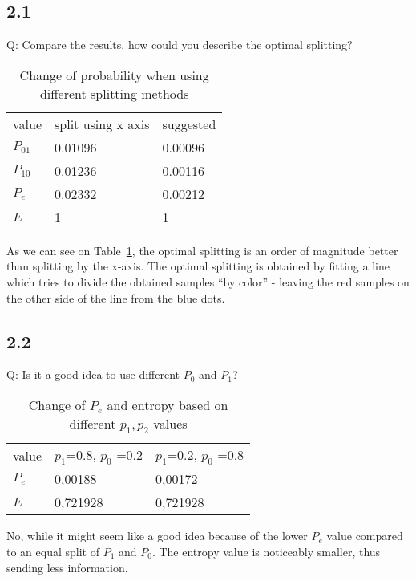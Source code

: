 \documentclass{article}
\begin{document}
\subsection*{2.1}
Q: Compare the results, how could you describe the optimal splitting?   

\begin{table}[ht!]
    \caption{Change of probability when using different splitting methods}
    \label{tab:tab21}
    \begin{center}
        \begin{tabular}[c]{l|l|l}
            value & split using x axis & suggested\\
            $P_{01}$ & 0.01096 & 0.00096\\
            $P_{10}$ & 0.01236 & 0.00116\\
            $P_e$ & 0.02332 & 0.00212\\
            $E$ & 1 & 1\\
        \end{tabular}
    \end{center}
\end{table}

As we can see on Table~\ref{tab:tab21}, the optimal splitting is an order of magnitude better than
splitting by the x-axis. The optimal splitting is obtained by fitting a line
which tries to divide the obtained samples “by color” - leaving the red samples
on the other side of the line from the blue dots. 

\subsection*{2.2} 
Q: Is it a good idea to use different $P_0$ and $P_1$?
\begin{table}[ht!]
    \caption{Change of $P_e$ and entropy based on different $p_1, p_2$ values}
    \label{tab:tab22}
    \begin{center}
        \begin{tabular}[c]{l|l|l}
            value & $p_1$=0.8, $p_0$ =0.2 &	$p_1$=0.2, $p_0$ =0.8\\
            $P_e$ & 0,00188 & 0,00172\\
            $E$ & 0,721928 & 0,721928\\
        \end{tabular}
    \end{center}
\end{table}

No, while it might seem like a good idea because of the lower $P_e$ value
compared to an equal split of $P_1$ and $P_0$. The entropy value is noticeably
smaller, thus sending less information. 
\end{document}
